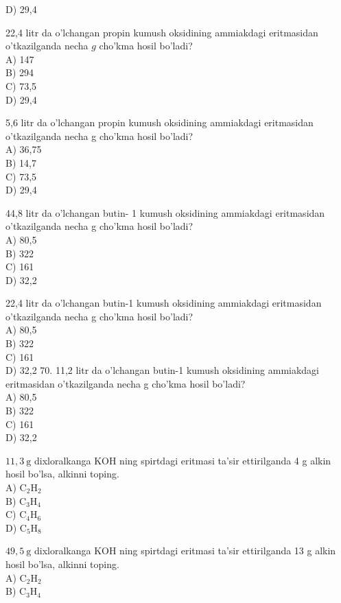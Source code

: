 D) 29,4
  \item 22,4 litr da o'lchangan propin kumush oksidining ammiakdagi eritmasidan o'tkazilganda necha $g$ cho'kma hosil bo'ladi?\\
A) 147\\
B) 294\\
C) 73,5\\
D) 29,4
  \item 5,6 litr da o'lchangan propin kumush oksidining ammiakdagi eritmasidan o'tkazilganda necha g cho'kma hosil bo'ladi?\\
A) 36,75\\
B) 14,7\\
C) 73,5\\
D) 29,4
  \item 44,8 litr da o'lchangan butin- 1 kumush oksidining ammiakdagi eritmasidan o'tkazilganda necha g cho'kma hosil bo'ladi?\\
A) 80,5\\
B) 322\\
C) 161\\
D) 32,2
  \item 22,4 litr da o'lchangan butin-1 kumush oksidining ammiakdagi eritmasidan o'tkazilganda necha g cho'kma hosil bo'ladi?\\
A) 80,5\\
B) 322\\
C) 161\\
D) 32,2
70. 11,2 litr da o'lchangan butin-1 kumush oksidining ammiakdagi eritmasidan o'tkazilganda necha g cho'kma hosil bo'ladi?\\
A) 80,5\\
B) 322\\
C) 161\\
D) 32,2
  \item $11,3 \mathrm{~g}$ dixloralkanga KOH ning spirtdagi eritmasi ta'sir ettirilganda 4 g alkin hosil bo'lsa, alkinni toping.\\
A) $\mathrm{C}_{2} \mathrm{H}_{2}$\\
B) $\mathrm{C}_{3} \mathrm{H}_{4}$\\
C) $\mathrm{C}_{4} \mathrm{H}_{6}$\\
D) $\mathrm{C}_{5} \mathrm{H}_{8}$
  \item $49,5 \mathrm{~g}$ dixloralkanga KOH ning spirtdagi eritmasi ta'sir ettirilganda 13 g alkin hosil bo'lsa, alkinni toping.\\
A) $\mathrm{C}_{2} \mathrm{H}_{2}$\\
B) $\mathrm{C}_{3} \mathrm{H}_{4}$\\
